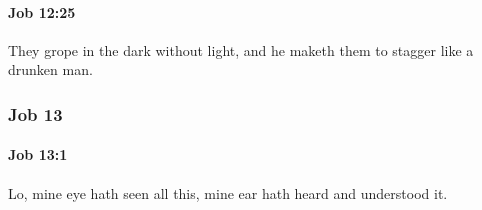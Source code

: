 		\paragraph{Job 12:25} %
			\label{JOB-12-25}

			They grope in the dark without light, and he maketh them to stagger like a drunken man.

	\subsubsection{Job 13} %
		\label{JOB-13}

		\paragraph{Job 13:1} %
			\label{JOB-13-1}

			Lo, mine eye hath seen all this, mine ear hath heard and understood it.



